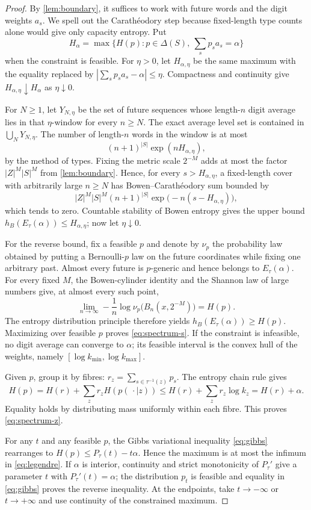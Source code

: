 \begin{proof}
By \cref{lem:boundary}, it suffices to work with future words and the digit
weights $a_s$.  We spell out the Carath\'eodory step because fixed-length type
counts alone would give only capacity entropy.  Put
\[
 H_\alpha=\max\{H(p):p\in\Delta(S),\ \textstyle\sum_s p_sa_s=\alpha\}
\]
when the constraint is feasible.  For $\eta>0$, let $H_{\alpha,\eta}$ be the
same maximum with the equality replaced by
$|\sum_s p_sa_s-\alpha|\leq\eta$.  Compactness and continuity give
$H_{\alpha,\eta}\downarrow H_\alpha$ as $\eta\downarrow0$.

For $N\geq1$, let $Y_{N,\eta}$ be the set of future sequences whose
length-$n$ digit average lies in that $\eta$-window for every $n\geq N$.
The exact average level set is contained in
$\bigcup_NY_{N,\eta}$.  The number of length-$n$ words in the window is at
most
\[
 (n+1)^{|S|}\exp(nH_{\alpha,\eta}),
\]
by the method of types.  Fixing the metric scale $2^{-M}$ adds at most the
factor $|Z|^M|S|^M$ from \cref{lem:boundary}.  Hence, for every
$s>H_{\alpha,\eta}$, a fixed-length cover with arbitrarily large
$n\geq N$ has Bowen--Carath\'eodory sum bounded by
\[
 |Z|^M|S|^M(n+1)^{|S|}
 \exp\bigl(-n(s-H_{\alpha,\eta})\bigr),
\]
which tends to zero.  Countable stability of Bowen entropy gives the upper
bound $h_B(E_\tau(\alpha))\leq H_{\alpha,\eta}$; now let
$\eta\downarrow0$.

For the reverse bound, fix a feasible $p$ and denote by $\nu_p$ the probability
law obtained by putting a Bernoulli-$p$ law on the future coordinates while
fixing one arbitrary past.  Almost every future is
$p$-generic and hence belongs to $E_\tau(\alpha)$.  For every fixed $M$, the
Bowen-cylinder identity and the Shannon law of large numbers give, at almost
every such point,
\[
 \lim_{n\to\infty}-\frac1n
 \log\nu_p\bigl(B_n(x,2^{-M})\bigr)=H(p).
\]
The entropy distribution principle therefore yields
$h_B(E_\tau(\alpha))\geq H(p)$.  Maximizing over feasible $p$ proves
\eqref{eq:spectrum-s}.  If the constraint is infeasible, no digit average can
converge to $\alpha$; its feasible interval is the convex hull of the weights,
namely $[\log k_{\min},\log k_{\max}]$.

Given $p$, group it by fibres:
$r_z=\sum_{s\in\tau^{-1}(z)}p_s$.  The entropy chain rule gives
\[
 H(p)=H(r)+\sum_z r_z H(p(\,\cdot\mid z))
 \leq H(r)+\sum_z r_z\log k_z=H(r)+\alpha.
 \tag{5.6}\label{eq:conditional-max}
\]
Equality holds by distributing mass uniformly within each fibre.  This
proves \eqref{eq:spectrum-z}.

For any $t$ and any feasible $p$, the Gibbs variational inequality
\eqref{eq:gibbs} rearranges to
$H(p)\leq P_\tau(t)-t\alpha$.  Hence the maximum is at most the infimum in
\eqref{eq:legendre}.  If $\alpha$ is interior, continuity and strict
monotonicity of $P_\tau'$ give a parameter $t$ with
$P_\tau'(t)=\alpha$; the distribution $p_t$ is feasible and equality in
\eqref{eq:gibbs} proves the reverse inequality.  At the endpoints, take
$t\to-\infty$ or $t\to+\infty$ and use continuity of the constrained maximum.
\end{proof}

